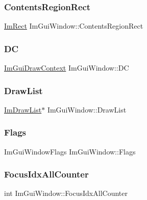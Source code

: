 \subsubsection{\texorpdfstring{Contents\+Region\+Rect}{ContentsRegionRect}}
{\footnotesize\ttfamily \hyperlink{struct_im_rect}{Im\+Rect} Im\+Gui\+Window\+::\+Contents\+Region\+Rect}

\hypertarget{struct_im_gui_window_a3a20c68996093058481ae8e174258a04}{}\label{struct_im_gui_window_a3a20c68996093058481ae8e174258a04} 
\subsubsection{\texorpdfstring{DC}{DC}}
{\footnotesize\ttfamily \hyperlink{struct_im_gui_draw_context}{Im\+Gui\+Draw\+Context} Im\+Gui\+Window\+::\+DC}

\hypertarget{struct_im_gui_window_a39de4668b09754136c6fd7ab89ab674a}{}\label{struct_im_gui_window_a39de4668b09754136c6fd7ab89ab674a} 
\subsubsection{\texorpdfstring{Draw\+List}{DrawList}}
{\footnotesize\ttfamily \hyperlink{struct_im_draw_list}{Im\+Draw\+List}$\ast$ Im\+Gui\+Window\+::\+Draw\+List}

\hypertarget{struct_im_gui_window_a7c29e810a533b9a647cce5d93d45057f}{}\label{struct_im_gui_window_a7c29e810a533b9a647cce5d93d45057f} 
\subsubsection{\texorpdfstring{Flags}{Flags}}
{\footnotesize\ttfamily Im\+Gui\+Window\+Flags Im\+Gui\+Window\+::\+Flags}

\hypertarget{struct_im_gui_window_a51ee526aed5b993e0a849f2db1fdc4dc}{}\label{struct_im_gui_window_a51ee526aed5b993e0a849f2db1fdc4dc} 
\subsubsection{\texorpdfstring{Focus\+Idx\+All\+Counter}{FocusIdxAllCounter}}
{\footnotesize\ttfamily int Im\+Gui\+Window\+::\+Focus\+Idx\+All\+Counter}

